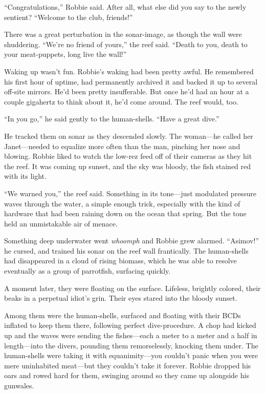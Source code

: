 “Congratulations,” Robbie said. After all, what else did you say to
the newly sentient? “Welcome to the club, friends!”

There was a great perturbation in the sonar-image, as though the
wall were shuddering. “We’re no friend of yours,” the reef said.
“Death to you, death to your meat-puppets, long live the wall!”

Waking up wasn’t fun. Robbie’s waking had been pretty awful. He
remembered his first hour of uptime, had permanently archived it
and backed it up to several off-site mirrors. He’d been pretty
insufferable. But once he’d had an hour at a couple gigahertz to
think about it, he’d come around. The reef would, too.

“In you go,” he said gently to the human-shells. “Have a great
dive.”

He tracked them on sonar as they descended slowly. The woman—he
called her Janet—needed to equalize more often than the man,
pinching her nose and blowing. Robbie liked to watch the low-rez
feed off of their cameras as they hit the reef. It was coming up
sunset, and the sky was bloody, the fish stained red with its
light.

“We warned you,” the reef said. Something in its tone—just
modulated pressure waves through the water, a simple enough trick,
especially with the kind of hardware that had been raining down on
the ocean that spring. But the tone held an unmistakable air of
menace.

Something deep underwater went \emph{whoomph} and Robbie grew
alarmed. “Asimov!” he cursed, and trained his sonar on the reef
wall frantically. The human-shells had disappeared in a cloud of
rising biomass, which he was able to resolve eventually as a group
of parrotfish, surfacing quickly.

A moment later, they were floating on the surface. Lifeless,
brightly colored, their beaks in a perpetual idiot’s grin. Their
eyes stared into the bloody sunset.

Among them were the human-shells, surfaced and floating with their
BCDs inflated to keep them there, following perfect dive-procedure.
A chop had kicked up and the waves were sending the fishes—each a
meter to a meter and a half in length—into the divers, pounding
them remorselessly, knocking them under. The human-shells were
taking it with equanimity—you couldn’t panic when you were mere
uninhabited meat—but they couldn’t take it forever. Robbie dropped
his oars and rowed hard for them, swinging around so they came up
alongside his gunwales.

